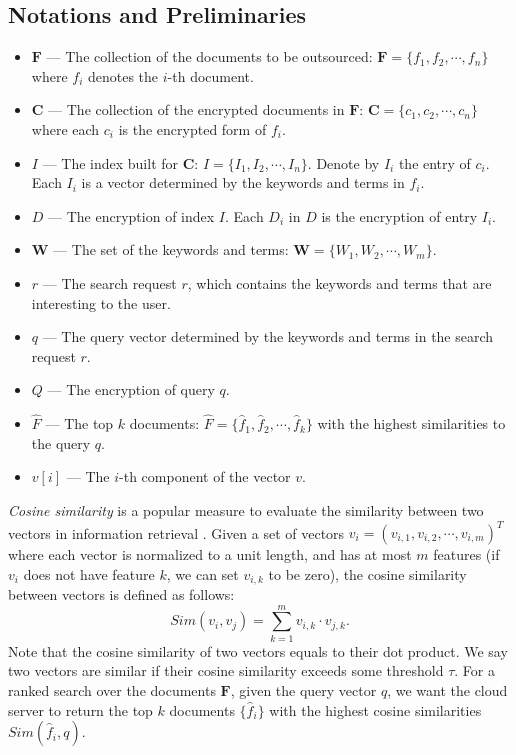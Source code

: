 \documentclass{IEEEtran}
\begin{document}
\subsection{Notations and Preliminaries}
\label{sec:prelim}
\begin{itemize}
\item $\mathbf{F}$ \---- The collection of the documents to be outsourced: $\mathbf{F} = \{f_1, f_2, \cdots, f_n\}$ where $f_i$ denotes the $i$-th document.
\item $\mathbf{C}$ \---- The collection of the encrypted documents in $\mathbf{F}$: $\mathbf{C} = \{c_1, c_2, \cdots, c_n\}$ where each $c_i$ is the encrypted form of $f_i$.
\item $I$ \---- The index built for $\mathbf{C}$: $I = \{I_1, I_2, \cdots, I_n\}$. Denote by $I_i$ the entry of $c_i$. Each $I_i$ is a vector determined by the keywords and terms in $f_i$.
\item $D$ \---- The encryption of index $I$. Each $D_i$ in $D$ is the encryption of entry $I_i$.
\item $\mathbf{W}$ \---- The set of the keywords and terms: $\mathbf{W} = \{W_1, W_2, \cdots, W_m\}$.
\item $r$ \---- The search request $r$, which contains the keywords and terms that are interesting to the user.
\item $q$ \---- The query vector determined by the keywords and terms in the search request $r$.
\item $Q$ \---- The encryption of query $q$.
\item $\hat{F}$ \---- The top $k$ documents: $\hat{F} = \{\hat{f}_1, \hat{f}_2, \cdots, \hat{f}_k\}$ with the highest similarities to the query $q$.
\item $v[i]$ \---- The $i$-th component of the vector $v$.
\end{itemize}

\emph{Cosine similarity} is a popular measure to evaluate the similarity between two vectors in information retrieval \cite{Sun13,ATY13,TAJY14}. Given a set of vectors $v_i = (v_{i,1}, v_{i,2}, \cdots, v_{i,m})^T$ where each vector is normalized to a unit length, and has at most $m$ features (if $v_i$ does not have feature $k$, we can set $v_{i,k}$ to be zero), the cosine similarity between vectors is defined as follows:
$$Sim(v_i,v_j) = \sum_{k=1}^m v_{i,k}\cdot v_{j,k}.$$
Note that the cosine similarity of two vectors equals to their dot product. We say two vectors are similar if their cosine similarity exceeds some threshold $\tau$. For a ranked search over the documents $\mathbf{F}$, given the query vector $q$, we want the cloud server to return the top $k$ documents $\{\hat{f}_i\}$ with the highest cosine similarities $Sim(\hat{f}_i, q)$.
\end{document}
